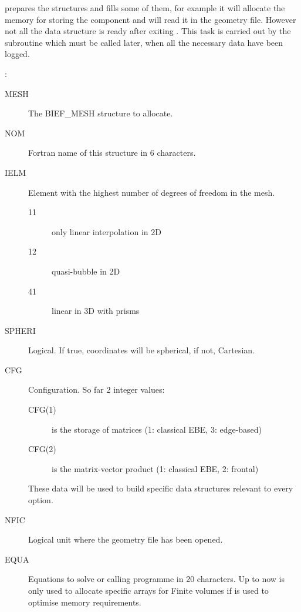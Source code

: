  prepares the  structures and fills some of
them, for example it will allocate the memory for storing the component
 and will read it in the geometry file. However not all the data
structure is ready after exiting . This task is carried out by
the subroutine  which must be called later, when all the
necessary data have been logged.

:
\begin{description}
\item [MESH] The BIEF\_MESH structure to allocate.
\item [NOM] Fortran name of this structure in 6 characters.
\item [IELM] Element with the highest number of degrees of freedom in the mesh.
  \begin{description}
  \item [11] only linear interpolation in 2D
  \item [12] quasi-bubble in 2D
  \item [41] linear in 3D with prisms
  \end{description}
\item [SPHERI] Logical. If true, coordinates will be spherical, if not, Cartesian.
\item [CFG] Configuration. So far 2 integer values:
  \begin{description}
    \item [CFG(1)] is the storage of matrices (1: classical EBE, 3: edge-based)
    \item [CFG(2)] is the matrix-vector product (1: classical EBE, 2: frontal)
  \end{description}
   These data will be used to build specific data structures relevant to
   every option.
\item [NFIC] Logical unit where the geometry file has been opened.
\item [EQUA] Equations to solve or calling programme in 20 characters. Up to
  now is only used to allocate specific arrays for Finite volumes if
   is used to optimise memory requirements.
\end{description}

